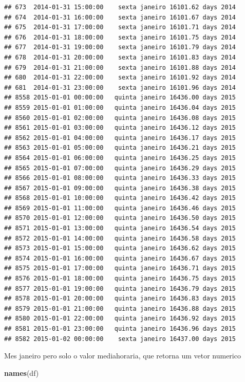 \documentclass[]{book}
\newenvironment{Shaded}{\begin{snugshade}}{\end{snugshade}}
\newcommand{\KeywordTok}[1]{\textcolor[rgb]{0.13,0.29,0.53}{\textbf{#1}}}
\newcommand{\NormalTok}[1]{#1}
\begin{document}
\begin{verbatim}
## 673  2014-01-31 15:00:00    sexta janeiro 16101.62 days 2014
## 674  2014-01-31 16:00:00    sexta janeiro 16101.67 days 2014
## 675  2014-01-31 17:00:00    sexta janeiro 16101.71 days 2014
## 676  2014-01-31 18:00:00    sexta janeiro 16101.75 days 2014
## 677  2014-01-31 19:00:00    sexta janeiro 16101.79 days 2014
## 678  2014-01-31 20:00:00    sexta janeiro 16101.83 days 2014
## 679  2014-01-31 21:00:00    sexta janeiro 16101.88 days 2014
## 680  2014-01-31 22:00:00    sexta janeiro 16101.92 days 2014
## 681  2014-01-31 23:00:00    sexta janeiro 16101.96 days 2014
## 8558 2015-01-01 00:00:00   quinta janeiro 16436.00 days 2015
## 8559 2015-01-01 01:00:00   quinta janeiro 16436.04 days 2015
## 8560 2015-01-01 02:00:00   quinta janeiro 16436.08 days 2015
## 8561 2015-01-01 03:00:00   quinta janeiro 16436.12 days 2015
## 8562 2015-01-01 04:00:00   quinta janeiro 16436.17 days 2015
## 8563 2015-01-01 05:00:00   quinta janeiro 16436.21 days 2015
## 8564 2015-01-01 06:00:00   quinta janeiro 16436.25 days 2015
## 8565 2015-01-01 07:00:00   quinta janeiro 16436.29 days 2015
## 8566 2015-01-01 08:00:00   quinta janeiro 16436.33 days 2015
## 8567 2015-01-01 09:00:00   quinta janeiro 16436.38 days 2015
## 8568 2015-01-01 10:00:00   quinta janeiro 16436.42 days 2015
## 8569 2015-01-01 11:00:00   quinta janeiro 16436.46 days 2015
## 8570 2015-01-01 12:00:00   quinta janeiro 16436.50 days 2015
## 8571 2015-01-01 13:00:00   quinta janeiro 16436.54 days 2015
## 8572 2015-01-01 14:00:00   quinta janeiro 16436.58 days 2015
## 8573 2015-01-01 15:00:00   quinta janeiro 16436.62 days 2015
## 8574 2015-01-01 16:00:00   quinta janeiro 16436.67 days 2015
## 8575 2015-01-01 17:00:00   quinta janeiro 16436.71 days 2015
## 8576 2015-01-01 18:00:00   quinta janeiro 16436.75 days 2015
## 8577 2015-01-01 19:00:00   quinta janeiro 16436.79 days 2015
## 8578 2015-01-01 20:00:00   quinta janeiro 16436.83 days 2015
## 8579 2015-01-01 21:00:00   quinta janeiro 16436.88 days 2015
## 8580 2015-01-01 22:00:00   quinta janeiro 16436.92 days 2015
## 8581 2015-01-01 23:00:00   quinta janeiro 16436.96 days 2015
## 8582 2015-01-02 00:00:00    sexta janeiro 16437.00 days 2015
\end{verbatim}

Mes janeiro pero solo o valor mediahoraria, que retorna um vetor
numerico

\begin{Shaded}
\begin{Highlighting}[]
\KeywordTok{names}\NormalTok{(df)}
\end{Highlighting}
\end{Shaded}
\end{document}
